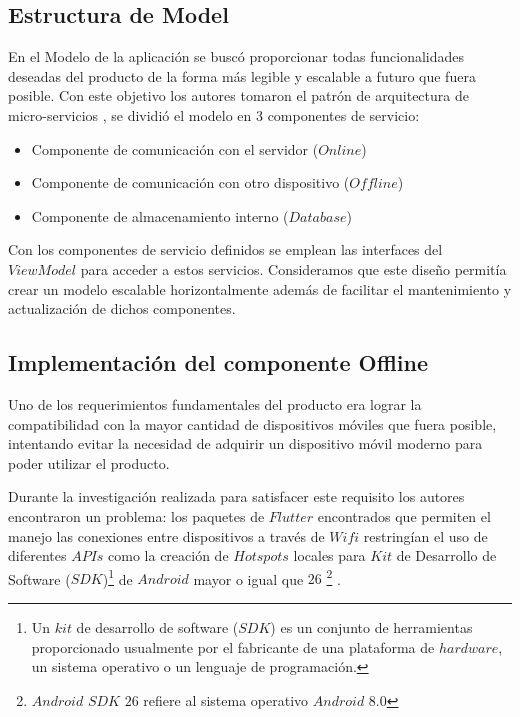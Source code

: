 \subsection{Estructura de Model}

En el Modelo de la aplicación se buscó proporcionar todas funcionalidades deseadas del producto de la forma más legible y escalable a futuro que fuera posible. Con este objetivo los autores tomaron el patrón de arquitectura de micro-servicios , se dividió el modelo en 3 componentes de servicio: 

\begin{itemize}
\item Componente de comunicación con el servidor ($Online$)
\item Componente de comunicación con otro dispositivo ($Offline$)
\item Componente de almacenamiento interno ($Database$)
\end{itemize}

Con los componentes de servicio definidos se emplean las interfaces del $ViewModel$ para acceder a estos servicios. Consideramos que este diseño permitía crear un modelo escalable horizontalmente además de facilitar el mantenimiento y actualización de dichos componentes.

\subsection{Implementación del componente Offline}

Uno de los requerimientos fundamentales del producto era lograr la compatibilidad con la mayor cantidad de dispositivos móviles que fuera posible, intentando evitar la necesidad de adquirir un dispositivo móvil moderno para poder utilizar el producto.

Durante la investigación realizada para satisfacer este requisito los autores encontraron un problema: los paquetes de $Flutter$ encontrados que permiten el manejo las conexiones entre dispositivos a través de $Wifi$ restringían el uso de diferentes $APIs$ como la creación de $Hotspots$ locales para $Kit$ de Desarrollo de Software ($SDK$)\footnote{Un $kit$ de desarrollo de software ($SDK$) es un conjunto de herramientas proporcionado usualmente por el fabricante de una plataforma de $hardware$, un sistema operativo o un lenguaje de programación.} de $Android$ mayor o igual que $26$ \footnote{$Android$ $SDK$ $26$ refiere al sistema operativo $Android$ $8.0$} .

